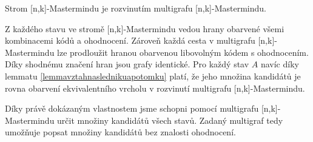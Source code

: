 \begin{veta}
    Strom [n,k]-Mastermindu je rozvinutím multigrafu [n,k]-Mastermindu.
\end{veta}
\begin{dukaz}
    Z každého stavu ve stromě [n,k]-Mastermindu vedou hrany obarvené všemi kombinacemi kódů a ohodnocení. Zároveň každá cesta v multigrafu [n,k]-Mastermindu lze prodloužit hranou obarvenou libovolným kódem s ohodnocením. Díky shodnému značení hran jsou grafy identické. Pro každý stav $A$ navíc díky lemmatu \ref{lemmavztahnaslednikuapotomku} platí, že jeho množina kandidátů je rovna obarvení ekvivalentního vrcholu v rozvinutí multigrafu [n,k]-Mastermindu.
    



\end{dukaz}
Díky právě dokázaným vlastnostem jsme schopni pomocí multigrafu [n,k]-Mastermindu určit množiny kandidátů všech stavů. Zadaný multigraf tedy umožňuje popsat množiny kandidátů bez znalosti ohodnocení. 



